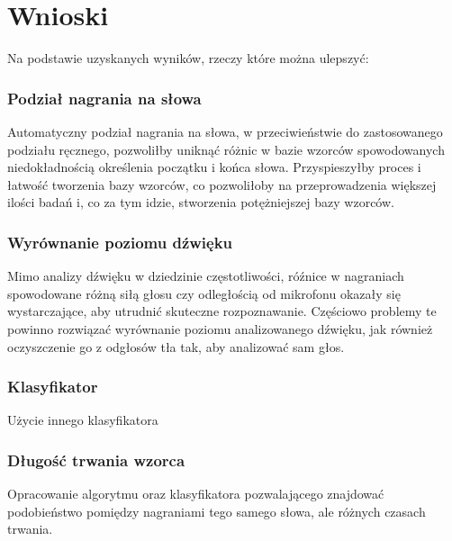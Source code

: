 \section{Wnioski}

Na podstawie uzyskanych wyników, 
rzeczy które można ulepszyć:

\subsubsection{Podział nagrania na słowa}
Automatyczny podział nagrania na słowa, w przeciwieństwie do zastosowanego podziału ręcznego, pozwoliłby uniknąć różnic w bazie wzorców spowodowanych niedokładnością określenia początku i końca słowa. Przyspieszyłby proces i łatwość tworzenia bazy wzorców, co pozwoliłoby na przeprowadzenia większej ilości badań i, co za tym idzie, stworzenia potężniejszej bazy wzorców.

\subsubsection{Wyrównanie poziomu dźwięku}
Mimo analizy dźwięku w dziedzinie częstotliwości, róźnice w nagraniach spowodowane różną siłą głosu czy odległością od mikrofonu okazały się wystarczające, aby utrudnić skuteczne rozpoznawanie. Częściowo problemy te powinno rozwiązać wyrównanie poziomu analizowanego dźwięku, jak również oczyszczenie go z odgłosów tła tak, aby analizować sam głos.

\subsubsection{Klasyfikator}
Użycie innego klasyfikatora

\subsubsection{Długość trwania wzorca}
Opracowanie algorytmu oraz klasyfikatora pozwalającego znajdować podobieństwo pomiędzy nagraniami tego samego słowa, ale różnych czasach trwania. 